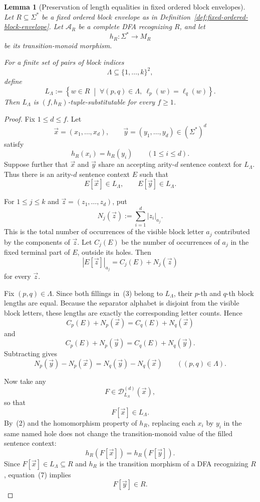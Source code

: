 \documentclass[11pt,a4paper]{article}
\newtheorem{lemma}[theorem]{Lemma}
\theoremstyle{remark}
\newcommand{\D}{\mathcal{D}}
\newcommand{\tuple}[1]{\vec{#1}}
\begin{document}
\begin{lemma}[Preservation of length equalities in fixed ordered block envelopes]
\label{lem:block-equality-envelopes}
Let \(R\subseteq\Sigma^*\) be a fixed ordered block envelope as in
Definition~\ref{def:fixed-ordered-block-envelope}.  Let \(\mathcal A_R\) be a
complete DFA recognizing \(R\), and let
\[
  h_R:\Sigma^*\longrightarrow M_R
\]
be its transition-monoid morphism.

For a finite set of pairs of block indices
\[
  \Lambda\subseteq\{1,\ldots,k\}^2,
\]
define
\[
  L_\Lambda
  :=
  \left\{
    w\in R
    \;\middle|\;
    \forall (p,q)\in\Lambda,\ 
    \ell_p(w)=\ell_q(w)
  \right\}.
\]
Then \(L_\Lambda\) is \((f,h_R)\)-tuple-substitutable for every \(f\ge1\).
\end{lemma}

\begin{proof}
Fix \(1\le d\le f\).  Let
\[
  \tuple x=(x_1,\ldots,x_d),
  \qquad
  \tuple y=(y_1,\ldots,y_d)
  \in(\Sigma^*)^d
\]
satisfy
\[
  h_R(x_i)=h_R(y_i)
  \qquad (1\le i\le d).
  \tag{2}
\]
Suppose further that \(\tuple x\) and \(\tuple y\) share an accepting
arity-\(d\) sentence context for \(L_\Lambda\).  Thus there is an arity-\(d\)
sentence context \(E\) such that
\[
  E[\tuple x]\in L_\Lambda,
  \qquad
  E[\tuple y]\in L_\Lambda.
  \tag{3}
\]

For \(1\le j\le k\) and
\(\tuple z=(z_1,\ldots,z_d)\), put
\[
  N_j(\tuple z)
  :=
  \sum_{i=1}^d |z_i|_{a_j}.
\]
This is the total number of occurrences of the visible block letter \(a_j\)
contributed by the components of \(\tuple z\).  Let \(C_j(E)\) be the number of
occurrences of \(a_j\) in the fixed terminal part of \(E\), outside its holes.
Then
\[
  |E[\tuple z]|_{a_j}
  =
  C_j(E)+N_j(\tuple z)
  \tag{4}
\]
for every \(\tuple z\).

Fix \((p,q)\in\Lambda\).  Since both fillings in~(3) belong to
\(L_\Lambda\), their \(p\)-th and \(q\)-th block lengths are equal.  Because
the separator alphabet is disjoint from the visible block letters, these
lengths are exactly the corresponding letter counts.  Hence
\[
  C_p(E)+N_p(\tuple x)
  =
  C_q(E)+N_q(\tuple x)
\]
and
\[
  C_p(E)+N_p(\tuple y)
  =
  C_q(E)+N_q(\tuple y).
\]
Subtracting gives
\[
  N_p(\tuple y)-N_p(\tuple x)
  =
  N_q(\tuple y)-N_q(\tuple x)
  \qquad ((p,q)\in\Lambda).
  \tag{5}
\]

Now take any
\[
  F\in\D_{L_\Lambda}^{(d)}(\tuple x),
\]
so that
\[
  F[\tuple x]\in L_\Lambda.
  \tag{6}
\]
By~(2) and the homomorphism property of \(h_R\), replacing each \(x_i\) by
\(y_i\) in the same named hole does not change the transition-monoid value of
the filled sentence context:
\[
  h_R(F[\tuple x])
  =
  h_R(F[\tuple y]).
  \tag{7}
\]
Since \(F[\tuple x]\in L_\Lambda\subseteq R\) and \(h_R\) is the transition
morphism of a DFA recognizing \(R\), equation~(7) implies
\[
  F[\tuple y]\in R.
  \tag{8}
\]


\end{proof}
\end{document}
